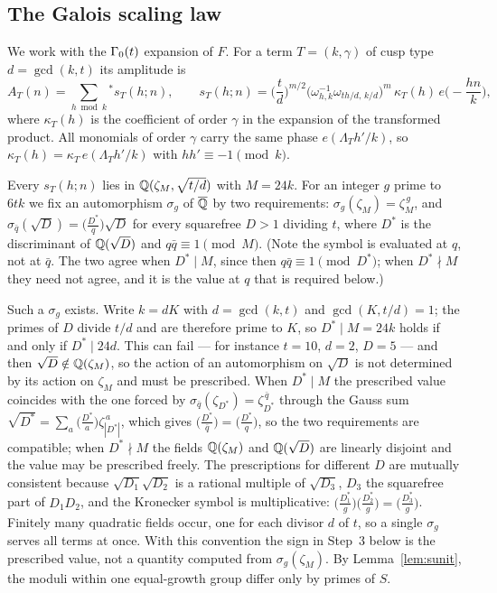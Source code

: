 \documentclass[11pt]{amsart}
\theoremstyle{definition}\newtheorem{definition}[theorem]{Definition}
\theoremstyle{remark}\newtheorem{remark}[theorem]{Remark}
\begin{document}
\subsection{The Galois scaling law}
We work with the $\Gamma_0(t)$ expansion of $F$. For a term $T=(k,\gamma)$ of cusp type $d=\gcd(k,t)$ its amplitude is
\begin{equation}\label{eq:model}
A_T(n)=\sum_{h\bmod k}{}^{*}s_T(h;n),\qquad
s_T(h;n)=\Big(\frac td\Big)^{m/2}\big(\omega_{h,k}^{-1}\omega_{th/d,\,k/d}\big)^{m}\,\kappa_T(h)\,e\Big(-\frac{hn}k\Big),
\end{equation}
where $\kappa_T(h)$ is the coefficient of order $\gamma$ in the expansion of the transformed product. All monomials of order $\gamma$ carry the same phase $e(\Lambda_T h'/k)$, so $\kappa_T(h)=\kappa_T\,e(\Lambda_Th'/k)$ with $hh'\equiv-1\pmod k$.

Every $s_T(h;n)$ lies in $\mathbb Q(\zeta_{M},\sqrt{t/d})$ with $M=24k$. For an integer $g$ prime to $6tk$ we fix an automorphism $\sigma_g$ of $\overline{\mathbb Q}$ by two requirements: $\sigma_g(\zeta_M)=\zeta_M^{\,g}$, and $\sigma_{\bar q}(\sqrt D)=\big(\tfrac{D^\ast}{q}\big)\sqrt D$ for every squarefree $D>1$ dividing $t$, where $D^\ast$ is the discriminant of $\mathbb Q(\sqrt D)$ and $q\bar q\equiv1\pmod{M}$. (Note the symbol is evaluated at $q$, not at $\bar q$. The two agree when $D^\ast\mid M$, since then $q\bar q\equiv1\pmod{D^\ast}$; when $D^\ast\nmid M$ they need not agree, and it is the value at $q$ that is required below.)

Such a $\sigma_g$ exists. Write $k=dK$ with $d=\gcd(k,t)$ and $\gcd(K,t/d)=1$; the primes of $D$ divide $t/d$ and are therefore prime to $K$, so $D^\ast\mid M=24k$ holds if and only if $D^\ast\mid 24d$. This can fail --- for instance $t=10$, $d=2$, $D=5$ --- and then $\sqrt D\notin\mathbb Q(\zeta_M)$, so the action of an automorphism on $\sqrt D$ is not determined by its action on $\zeta_M$ and must be prescribed. When $D^\ast\mid M$ the prescribed value coincides with the one forced by $\sigma_{\bar q}(\zeta_{D^\ast})=\zeta_{D^\ast}^{\,\bar q}$ through the Gauss sum $\sqrt{D^\ast}=\sum_{a}\big(\tfrac{D^\ast}{a}\big)\zeta_{|D^\ast|}^{\,a}$, which gives $\big(\tfrac{D^\ast}{\bar q}\big)=\big(\tfrac{D^\ast}{q}\big)$, so the two requirements are compatible; when $D^\ast\nmid M$ the fields $\mathbb Q(\zeta_M)$ and $\mathbb Q(\sqrt D)$ are linearly disjoint and the value may be prescribed freely. The prescriptions for different $D$ are mutually consistent because $\sqrt{D_1}\sqrt{D_2}$ is a rational multiple of $\sqrt{D_3}$, $D_3$ the squarefree part of $D_1D_2$, and the Kronecker symbol is multiplicative: $\big(\tfrac{D_1^\ast}{g}\big)\big(\tfrac{D_2^\ast}{g}\big)=\big(\tfrac{D_3^\ast}{g}\big)$. Finitely many quadratic fields occur, one for each divisor $d$ of $t$, so a single $\sigma_g$ serves all terms at once. With this convention the sign in Step~3 below is the prescribed value, not a quantity computed from $\sigma_g(\zeta_M)$. By Lemma~\ref{lem:sunit}, the moduli within one equal-growth group differ only by primes of $S$.
\end{document}
